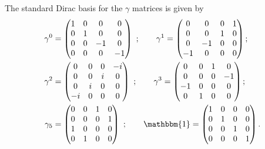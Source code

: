 \documentclass[foundations,article,submit,pdftex,moreauthors]{Definitions/mdpi}
\begin{document}
The standard Dirac basis for the $\gamma$ matrices is given by
\begin{align*}
\gamma^0&=\begin{pmatrix}1&0&0&0\\0&1&0&0\\0&0&-1&0\\0&0&0&-1\end{pmatrix}~;~~~~~~
\gamma^1=\begin{pmatrix}0&0&0&1\\0&0&1&0\\0&-1&0&0\\-1&0&0&0\end{pmatrix};\\
\gamma^2&=\begin{pmatrix}0&0&0&-i\\0&0&i&0\\0&i&0&0\\-i&0&0&0\end{pmatrix}~;~~~~~~
\gamma^3=\begin{pmatrix}0&0&1&0\\0&0&0&-1\\-1&0&0&0\\0&1&0&0\end{pmatrix};\\
\gamma_5&=\begin{pmatrix}0&0&1&0\\0&0&0&1\\1&0&0&0\\0&1&0&0\end{pmatrix}~;~~~~~~
\mathbbm{1}=\begin{pmatrix}1&0&0&0\\0&1&0&0\\0&0&1&0\\0&0&0&1\end{pmatrix}.
\end{align*}
\end{document}
